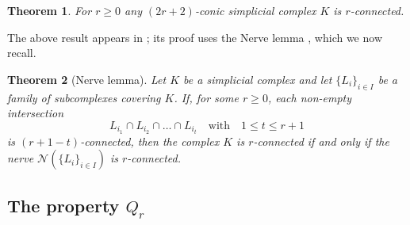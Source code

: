 \documentclass[11pt,twoside, reqno]{amsart}
\theoremstyle{plain}
\newtheorem{lema}{Lemma}
\newtheorem{teo}[lema]{Theorem}
\theoremstyle{definition}
\newtheorem{ej}[lema]{Example}
\newcommand{\N}{\mathbb{N}}
\newcommand{\st}{\textrm{st}}
\begin{document}





\begin{teo} For $r\ge 0$ any $(2r+2)$-conic simplicial complex $K$ is $r$-connected. 
\end{teo}

The above result appears in \cite{Bar2}; its proof 
uses the Nerve lemma \cite{Bjo}, which we now recall.

\begin{teo}[Nerve lemma] \label{nerv}
Let $K$ be a simplicial complex and let $\{L_i\}_{i\in I}$ be a family of subcomplexes covering $K$. If, for some $r\ge 0$, each non-empty intersection 
$$L_{i_1}\cap L_{i_2} \cap \ldots \cap L_{i_t}\quad \mbox{with}\quad  1\le t\le r+1$$ is $(r+1-t)$-connected, then the complex $K$ is $r$-connected if and only if the nerve $\mathcal{N}(\{L_i\}_{i\in I})$ is $r$-connected.
\end{teo}  

  \subsection{The property $Q_r$}
\end{document}
